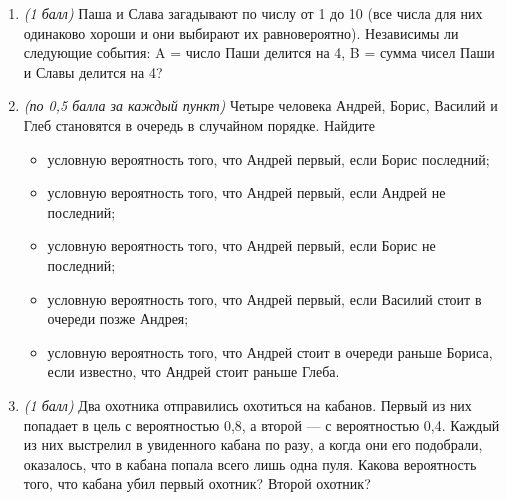 \documentclass{article}
\begin{document}
\begin{enumerate}
    \item \textit{(1 балл)} Паша и Слава загадывают по числу от 1 до 10 (все числа для них одинаково
    хороши и они выбирают их равновероятно). Независимы ли следующие события:
    A = число Паши делится на 4,
    B = сумма чисел Паши и Славы делится на 4?
    \item \textit{(по 0,5 балла за каждый пункт)} Четыре человека Андрей, Борис, Василий и Глеб
    становятся в очередь в случайном порядке. Найдите
    \begin{itemize}
        \item условную вероятность того, что Андрей первый, если Борис последний;
        \item условную вероятность того, что Андрей первый, если Андрей не последний;
        \item условную вероятность того, что Андрей первый, если Борис не последний;
        \item условную вероятность того, что Андрей первый, если Василий стоит в очереди
        позже Андрея;
        \item условную вероятность того, что Андрей стоит в очереди раньше Бориса, если
        известно, что Андрей стоит раньше Глеба.
    \end{itemize}
    \item \textit{(1 балл)} Два охотника отправились охотиться на кабанов. Первый из них попадает в
    цель с вероятностью 0,8, а второй — с вероятностью 0,4. Каждый из них выстрелил
    в увиденного кабана по разу, а когда они его подобрали, оказалось, что в кабана
    попала всего лишь одна пуля. Какова вероятность того, что кабана убил первый
    охотник? Второй охотник?
  \end{enumerate}
\end{document}
